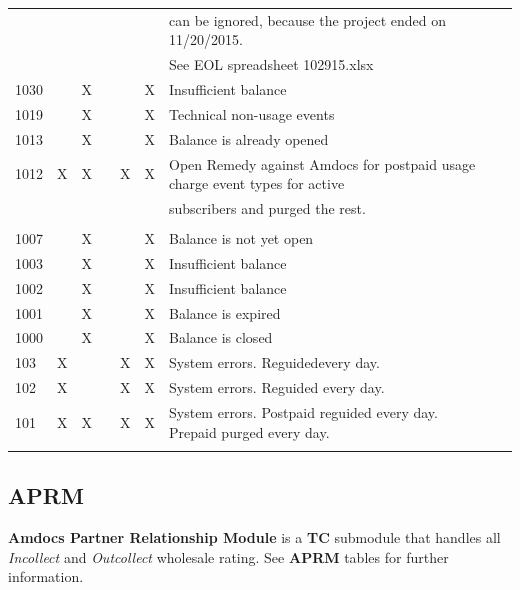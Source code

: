 \documentclass[12pt,twoside]{article}
\begin{document}
\begin{landscape}
\begin{longtable}{l|l|l|l|l|l|l|l|l}
 &  &  &  &  &  & can be ignored, because the project ended on 11/20/2015.\\
 &  &  &  &  &  & See   EOL spreadsheet 102915.xlsx\\
1030 &  & X &  &  & X & Insufficient balance\\
1019 &  & X &  &  & X & Technical non-usage events\\
1013 &  & X &  &  & X & Balance is already opened\\
1012 & X & X &  & X & X & Open Remedy against Amdocs for postpaid usage charge event types for active\\
 &  &  &  &  &  & subscribers and purged the rest.\\
 &  &  &  &  &  & \\
1007 &  & X &  &  & X & Balance is not yet open\\
1003 &  & X &  &  & X & Insufficient balance\\
1002 &  & X &  &  & X & Insufficient balance\\
1001 &  & X &  &  & X & Balance is expired\\
1000 &  & X &  &  & X & Balance is closed\\
103 & X &  &  & X & X & System errors. Reguidedevery day.\\
102 & X &  &  & X & X & System errors. Reguided every day.\\
101 & X & X &  & X & X & System errors. Postpaid reguided every day.  Prepaid purged every day.\\
 &  &  &  &  &  & \\
\hline
\end{longtable}
\end{landscape} 
\newpage
\normalsize

\subsection{APRM}
\label{sec:orgheadline8}
\textbf{Amdocs Partner Relationship Module} is a \textbf{TC} submodule that handles all \emph{Incollect} and \emph{Outcollect} wholesale rating. See \textbf{APRM} tables for further information.
\end{document}
